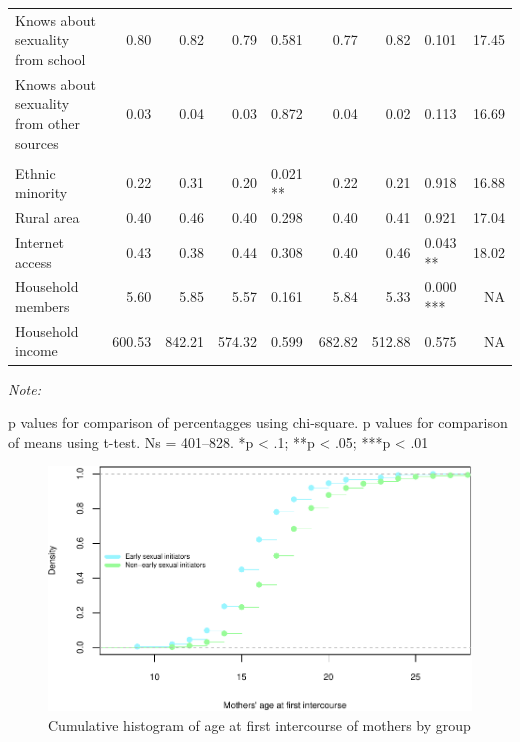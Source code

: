 \documentclass[
]{article}
\begin{document}
\begin{landscape}
\begin{table}[!h]
{\begin{threeparttable}
\begin{tabular}[t]{lrrrlrrlr}
\hspace{1em}Knows about sexuality from school & 0.80 & 0.82 & 0.79 & 0.581 & 0.77 & 0.82 & 0.101 & 17.45\\
\hspace{1em}Knows about sexuality from other sources & 0.03 & 0.04 & 0.03 & 0.872 & 0.04 & 0.02 & 0.113 & 16.69\\
\addlinespace[2em]
\multicolumn{9}{l}{\textit{Household-related variables}}\\
\hspace{1em}Ethnic minority & 0.22 & 0.31 & 0.20 & 0.021 ** & 0.22 & 0.21 & 0.918 & 16.88\\
\hspace{1em}Rural area & 0.40 & 0.46 & 0.40 & 0.298 & 0.40 & 0.41 & 0.921 & 17.04\\
\hspace{1em}Internet access & 0.43 & 0.38 & 0.44 & 0.308 & 0.40 & 0.46 & 0.043 ** & 18.02\\
\hspace{1em}Household members & 5.60 & 5.85 & 5.57 & 0.161 & 5.84 & 5.33 & 0.000 *** & NA\\
\hspace{1em}Household income & 600.53 & 842.21 & 574.32 & 0.599 & 682.82 & 512.88 & 0.575 & NA\\
\bottomrule
\end{tabular}
\begin{tablenotes}[para]
\item \textit{Note: } 
\item p values for comparison of percentagges using chi-square. p values for comparison of means using t-test. Ns = 401–828. *p < .1; **p < .05; ***p < .01
\end{tablenotes}
\end{threeparttable}}
\end{table}
\end{landscape}
\newpage

\begin{figure}

{\centering \includegraphics[width=0.8\linewidth,height=0.7\textheight]{early_sexual_activity_report_files/figure-latex/unnamed-chunk-4-1} 

}

\caption{Cumulative histogram of age at first intercourse of mothers by group}\label{fig:unnamed-chunk-4}
\end{figure}
\end{document}
